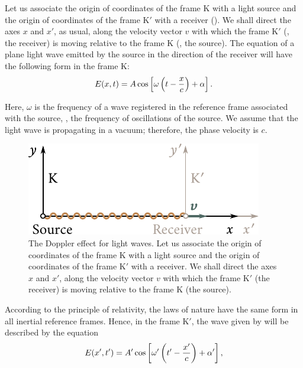 Let us associate the origin of coordinates of the frame K with a light source and the origin of coordinates of the frame K$'$ with a receiver ().
We shall direct the axes $x$ and $x'$, as usual, along the velocity vector $v$ with which the frame K$'$ (\ie, the receiver) is moving relative to the frame K (\ie, the source).
The equation of a plane light wave emitted by the source in the direction of the receiver will have the following form in the frame K:
\begin{equation}\label{eq:21_9}
	E(x,t) = A \cos\left[\omega \left(t - \frac{x}{c}\right) + \alpha\right].
\end{equation}

\noindent
Here, $\omega$ is the frequency of a wave registered in the reference frame associated with the source, \ie, the frequency of oscillations of the source.
We assume that the light wave is propagating in a vacuum; therefore, the phase velocity is $c$.

\begin{figure}[t]
	\begin{center}
		\includegraphics[scale=1]{figures/ch_21/fig_21_8.pdf}
        \caption[]{The Doppler effect for light waves. Let us associate the origin of coordinates of the frame K with a light source and the origin of coordinates of the frame K$'$ with a receiver. We shall direct the axes $x$ and $x'$, along the velocity vector $v$ with which the frame K$'$ (the receiver) is moving relative to the frame K (the source).}
		\label{fig:21_8}
	\end{center}
	\vspace{-0.8cm}
\end{figure}

According to the principle of relativity, the laws of nature have the same form in all inertial reference frames.
Hence, in the frame K$'$, the wave given by  will be described by the equation
\begin{equation}\label{eq:21_10}
	E(x',t') = A' \cos\left[\omega' \left(t' - \frac{x'}{c}\right) + \alpha'\right],
\end{equation}

